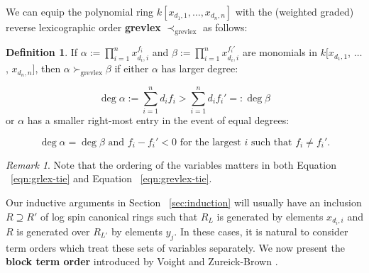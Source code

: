 \documentclass{amsart}
\theoremstyle{plain}
\theoremstyle{definition}
\newtheorem{defn}[thm]{Definition}
\theoremstyle{remark}
\newtheorem{rem}[thm]{Remark}
\numberwithin{equation}{section}
\newcommand{\halfcan}{L}
\begin{document}
We can equip the polynomial ring $k[x_{d_1, 1}, \ldots, x_{d_n, n}]$
with the (weighted graded) reverse lexicographic order
\textbf{grevlex} $\prec_{\text{grevlex}}$ as follows:

\begin{defn}
\label{defn:grevlex}
If $\alpha := \prod_{i = 1}^{n} x_{d_i, i}
^{f_i}$ and $\beta := \prod_{i = 1}^{n} x_{d_i, i}^{f_i'}$ are
monomials in $k[x_{d_1, 1}$, $\ldots$, $x_{d_n, n}]$, then $\alpha
\succ_{\text{grevlex}} \beta$ if either $\alpha$ has larger degree:

\begin{equation}
	\deg \alpha := \sum_{i = 1}^{n} d_i f_i  > \sum_{i = 1}^{n} d_i f_i' =: \deg \beta
\end{equation}
or $\alpha$ has a smaller right-most entry in the event of equal
degrees:

\begin{equation}
\label{eqn:grevlex-tie}
	\deg \alpha = \deg \beta \text{ and }	f_i - f_i' < 0 \text{ for
	the	largest } i \text{ such that } f_i \neq f_i'.
\end{equation}
\end{defn}

\begin{rem}
Note that the ordering of the variables matters in both
Equation ~\ref{eqn:grlex-tie} and Equation ~\ref{eqn:grevlex-tie}.
\end{rem}

Our inductive arguments in Section ~\ref{sec:induction} will
usually have an inclusion $R \supseteq R'$ of log spin canonical
rings such that $R_\halfcan$ is generated by elements $x_{d_i, i}$ and $R$
is generated over $R_{\halfcan'}$ by elements $y_j$. In these cases, it is
natural to consider term orders which treat these sets of variables
separately. We now present the \textbf{block term order} introduced
by Voight and Zureick-Brown \cite[Section 8.1]{vzb:stacky}.
\end{document}
